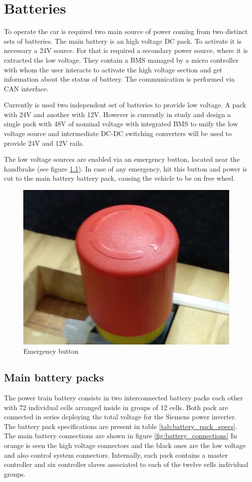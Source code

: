 \chapter{Batteries}
To operate the car is required two main source of power coming from two distinct sets of batteries. The main battery is an high voltage \gls{DC} pack. To activate it is necessary a 24V source. For that is required a secondary power source, where it is extracted the low voltage.
They contain a \gls{BMS} managed by a micro controller with whom the user interacts to activate the high voltage section and get information about the status of battery. The communication is performed via CAN interface.

Currently is used two independent set of batteries to provide low voltage. A pack with 24V and another with 12V. However is currently in study and design a single pack with 48V  of nominal voltage with integrated \gls{BMS} to unify the low voltage source and intermediate \gls{DC}-\gls{DC} switching converters will be used to provide 24V and 12V rails.

The low voltage sources are enabled via an emergency button, located near the handbrake (see figure \ref{fig:emergency_button}). In case of any emergency, hit this button and power is cut to the main battery battery pack, causing the vehicle to be on free wheel.

\begin{figure}[!h]
	\centering
	\includegraphics[width=0.4\linewidth]{figures/emergency_button}
	\caption{Emergency button}
	\label{fig:emergency_button}
\end{figure}

\section{Main battery packs}
The power train battery consists in two interconnected battery packs each other with 72 individual cells arranged inside in groups of 12 cells. Both pack are connected in series deploying the total voltage for the Siemens power inverter. The battery pack specifications are present in table \ref{tab:battery_pack_specs}. The main battery connections are shown in figure \ref{fig:battery_connections} In orange is seen the high voltage connectors and the black ones are the low voltage and also control system connectors. Internally, each pack contains a master controller and six controller slaves associated to each of the twelve cells individual groups.

